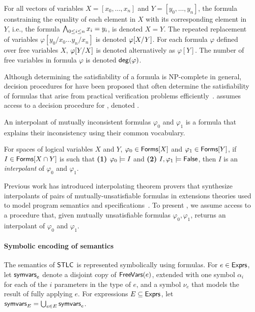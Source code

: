 For all vectors of variables $X = [ x_0, \ldots, x_n ]$ and $Y = [
y_0, \ldots, y_n ]$, the \lia formula constraining the equality of
each element in $X$ with its corresponding element in $Y$, i.e., the
formula $\bigland_{0 \leq i \leq n} x_i = y_i$, is denoted $X = Y$.
%
The repeated replacement of variables $\varphi[ y_0 / x_0 \ldots y_{n}
/ x_{n} ]$ is denoted $\replace{\varphi}{Y}{X}$.
%
For each formula $\varphi$ defined over free variables $X$,
$\replace{\varphi}{X}{Y}$ is denoted alternatively as $\varphi[Y]$.
%
The number of free variables in formula $\varphi$ is denoted
$\degreeof(\varphi)$.

Although determining the satisfiability of a \lia formula is
NP-complete in general, decision procedures for \lia have been
proposed that often determine the satisfiability of formulas that
arise from practical verification problems
efficiently~\cite{demoura08}.
%
\sys assumes access to a decision procedure for \lia, denoted \issat.

An interpolant of mutually inconsistent formulas $\varphi_0$ and
$\varphi_1$ is a \lia formula that explains their inconsistency using
their common vocabulary.
%
\begin{defn}
  \label{defn:itps}
  For spaces of logical variables $X$ and $Y$,
  $\varphi_0 \in \formulas{X}$ and
  $\varphi_1 \in \formulas{Y}$,
  if $I \in \formulas{X \intersection Y}$ is such that 
  \textbf{(1)} $\varphi_0 \entails I$ and %
  \textbf{(2)} $I, \varphi_1 \entails \false$, then $I$ is an
  \emph{interpolant} of $\varphi_0$ and $\varphi_1$.
\end{defn}
%
Previous work has introduced interpolating theorem provers that
synthesize interpolants of pairs of mutually-unsatisfiable formulas in
extensions theories used to model program semantics and
specifications~\cite{mcmillan04}.
%
To present \sys, we assume access to a procedure \solveitp that, given
mutually unsatisfiable \lia formulas $\varphi_0, \varphi_1$, returns
an interpolant of $\varphi_0$ and $\varphi_1$.

\paragraph{Symbolic encoding of semantics}
%
The semantics of $\stlc$ is represented symbolically using \lia
formulas.
%
For $e \in \expr$, let $\symvars{e}$ denote a disjoint copy of
$\freevars(e)$, extended with one symbol $\alpha_i$ for each of the
$i$ parameters in the type of $e$, and a symbol $\nu_e$ that
models the result of fully applying $e$. 
%
For expressions $E \subseteq \expr$, let $\symvars{E} = \bigunion_{e
  \in E} \symvars{e}$.

